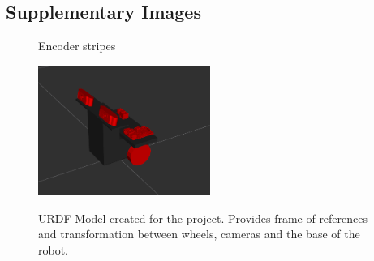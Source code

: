 \documentclass[10pt]{article}
\begin{document}
\subsection{Supplementary Images}
\begin{figure}[H]
\hfill
{}
\hfill
{}
\hfill
\caption{Encoder stripes}
\end{figure}
\begin{figure}[H]
\centering \includegraphics[width=0.5\textwidth]{urdf.png}\label{URDF Model}
\caption{URDF Model created for the project. Provides frame of references and transformation between wheels, cameras and the base of the robot.}
\end{figure}

\end{document}
